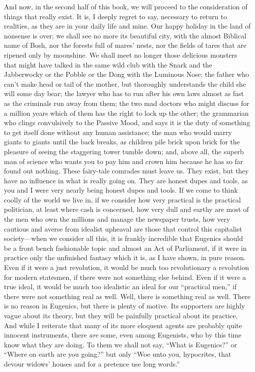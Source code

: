 \documentclass{book}
\begin{document}
And now, in the second half of this book, we will proceed to the consideration of things that really exist. It is, I deeply regret to say, necessary to return to realities, as they are in your daily life and mine. Our happy holiday in the land of nonsense is over; we shall see no more its beautiful city, with the almost Biblical name of Bosh, nor the forests full of mares’ nests, nor the fields of tares that are ripened only by moonshine. We shall meet no longer those delicious monsters that might have talked in the same wild club with the Snark and the Jabberwocky or the Pobble or the Dong with the Luminous Nose; the father who can’t make head or tail of the mother, but thoroughly understands the child she will some day bear; the lawyer who has to run after his own laws almost as fast as the criminals run away from them; the two mad doctors who might discuss for a million years which of them has the right to lock up the other; the grammarian who clings convulsively to the Passive Mood, and says it is the duty of something to get itself done without any human assistance; the man who would marry giants to giants until the back breaks, as children pile brick upon brick for the pleasure of seeing the staggering tower tumble down; and, above all, the superb man of science who wants you to pay him and crown him because he has so far found out nothing. These fairy-tale comrades must leave us. They exist, but they have no influence in what is really going on. They are honest dupes and tools, as you and I were very nearly being honest dupes and tools. If we come to think coolly of the world we live in, if we consider how very practical is the practical politician, at least where cash is concerned, how very dull and earthy are most of the men who own the millions and manage the newspaper trusts, how very cautious and averse from idealist upheaval are those that control this capitalist society—when we consider all this, it is frankly incredible that Eugenics should be a front bench fashionable topic and almost an Act of Parliament, if it were in practice only the unfinished fantasy which it is, as I have shown, in pure reason. Even if it were a just revolution, it would be much too revolutionary a revolution for modern statesmen, if there were not something else behind. Even if it were a true ideal, it would be much too idealistic an ideal for our “practical men,” if there were not something real as well. Well, there is something real as well. There is no reason in Eugenics, but there is plenty of motive. Its supporters are highly vague about its theory, but they will be painfully practical about its practice. And while I reiterate that many of its more eloquent agents are probably quite innocent instruments, there \emph{are} some, even among Eugenists, who by this time know what they are doing. To them we shall not say, “What is Eugenics?” or “Where on earth are you going?” but only “Woe unto you, hypocrites, that devour widows’ houses and for a pretence use long words.”
\end{document}

